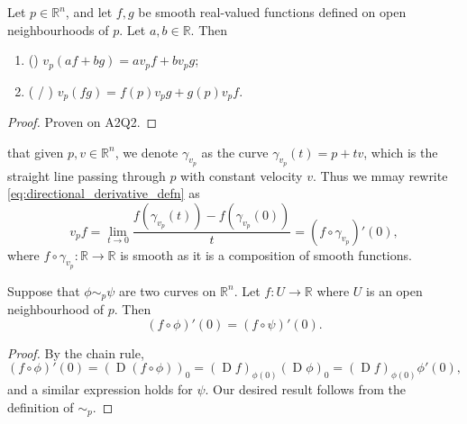 \documentclass[notoc,notitlepage]{tufte-book}
\DeclareMathOperator{\D}{D}
\begin{document}
\begin{thm}\label{thm:linearity_and_leibniz_rule_for_directional_derivatives}
  Let $p \in \mathbb{R}^n$, and let $f, g$ be smooth real-valued functions defined
  on open neighbourhoods of $p$. Let $a, b \in \mathbb{R}$. Then
  \begin{enumerate}
    \item () $v_p(af + bg) = av_p f + bv_p g$;
    \item ( / )
      $v_p(fg) = f(p) v_p g + g(p) v_p f$.
  \end{enumerate}
\end{thm}

\begin{proof}
  Proven on A2Q2.
\end{proof}

 that given $p, v \in \mathbb{R}^n$, we denote $\gamma_{v_p}$ as
the curve $\gamma_{v_p}(t) = p + tv$, which is the straight line passing through $p$
with constant velocity $v$. Thus we mmay rewrite \cref{eq:directional_derivative_defn}
as
\begin{equation}\label{eq:directional_derivative_defn_ver2}
  v_p f = \lim_{t \to 0} \frac{f(\gamma_{v_p}(t)) - f(\gamma_{v_p}(0))}{t}
    = (f \circ \gamma_{v_p})'(0),
\end{equation}
where $f \circ \gamma_{v_p} : \mathbb{R} \to \mathbb{R}$ is smooth as it is a
composition of smooth functions.

\begin{thm}\label{thm:canonical_directional_derivative_free_from_the_curve}
  Suppose that $\phi \sim_p \psi$ are two curves on $\mathbb{R}^n$. Let $f : U \to
  \mathbb{R}$ where $U$ is an open neighbourhood of $p$. Then
  \begin{equation*}
    (f \circ \phi)'(0) = (f \circ \psi)'(0).
  \end{equation*}
\end{thm}

\begin{proof}
  By the chain rule,
  \begin{equation*}
    (f \circ \phi)'(0) = (\D (f \circ \phi))_0 = (\D f)_{\phi(0)}(\D \phi)_0
      = (\D f)_{\phi(0)} \phi'(0),
  \end{equation*}
  and a similar expression holds for $\psi$. Our desired result follows from the
  definition of $\sim_p$.
\end{proof}
\end{document}

